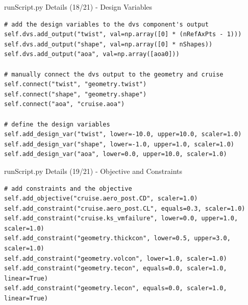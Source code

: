 \documentclass{bredelebeamer}
\begin{document}
\begin{frame}[fragile]{runScript.py Details (18/21) - \large Design Variables}
\scriptsize
\lstset{ language=bash }
\begin{lstlisting}
# add the design variables to the dvs component's output
self.dvs.add_output("twist", val=np.array([0] * (nRefAxPts - 1)))
self.dvs.add_output("shape", val=np.array([0] * nShapes))
self.dvs.add_output("aoa", val=np.array([aoa0]))

# manually connect the dvs output to the geometry and cruise
self.connect("twist", "geometry.twist")
self.connect("shape", "geometry.shape")
self.connect("aoa", "cruise.aoa")

# define the design variables
self.add_design_var("twist", lower=-10.0, upper=10.0, scaler=1.0)
self.add_design_var("shape", lower=-1.0, upper=1.0, scaler=1.0)
self.add_design_var("aoa", lower=0.0, upper=10.0, scaler=1.0)
\end{lstlisting}
\normalsize
\end{frame}

\begin{frame}[fragile]{runScript.py Details (19/21) - \large Objective and Constraints}
\scriptsize
\lstset{ language=bash }
\begin{lstlisting}
# add constraints and the objective
self.add_objective("cruise.aero_post.CD", scaler=1.0)
self.add_constraint("cruise.aero_post.CL", equals=0.3, scaler=1.0)
self.add_constraint("cruise.ks_vmfailure", lower=0.0, upper=1.0, scaler=1.0)
self.add_constraint("geometry.thickcon", lower=0.5, upper=3.0, scaler=1.0)
self.add_constraint("geometry.volcon", lower=1.0, scaler=1.0)
self.add_constraint("geometry.tecon", equals=0.0, scaler=1.0, linear=True)
self.add_constraint("geometry.lecon", equals=0.0, scaler=1.0, linear=True)
\end{lstlisting}
\normalsize
\end{frame}
\end{document}
